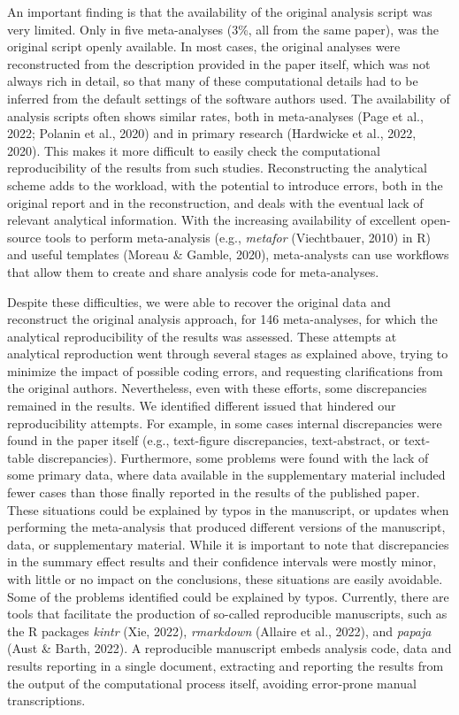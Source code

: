 \documentclass[
  ,apa7,floatsintext]{apa6}
\begin{document}
An important finding is that the availability of the original analysis script was very limited. Only in five meta-analyses (3\%, all from the same paper), was the original script openly available. In most cases, the original analyses were reconstructed from the description provided in the paper itself, which was not always rich in detail, so that many of these computational details had to be inferred from the default settings of the software authors used. The availability of analysis scripts often shows similar rates, both in meta-analyses (Page et al., 2022; Polanin et al., 2020) and in primary research (Hardwicke et al., 2022, 2020). This makes it more difficult to easily check the computational reproducibility of the results from such studies. Reconstructing the analytical scheme adds to the workload, with the potential to introduce errors, both in the original report and in the reconstruction, and deals with the eventual lack of relevant analytical information. With the increasing availability of excellent open-source tools to perform meta-analysis (e.g., \emph{metafor} (Viechtbauer, 2010) in R) and useful templates (Moreau \& Gamble, 2020), meta-analysts can use workflows that allow them to create and share analysis code for meta-analyses.

Despite these difficulties, we were able to recover the original data and reconstruct the original analysis approach, for 146 meta-analyses, for which the analytical reproducibility of the results was assessed. These attempts at analytical reproduction went through several stages as explained above, trying to minimize the impact of possible coding errors, and requesting clarifications from the original authors. Nevertheless, even with these efforts, some discrepancies remained in the results. We identified different issued that hindered our reproducibility attempts. For example, in some cases internal discrepancies were found in the paper itself (e.g., text-figure discrepancies, text-abstract, or text-table discrepancies). Furthermore, some problems were found with the lack of some primary data, where data available in the supplementary material included fewer cases than those finally reported in the results of the published paper. These situations could be explained by typos in the manuscript, or updates when performing the meta-analysis that produced different versions of the manuscript, data, or supplementary material. While it is important to note that discrepancies in the summary effect results and their confidence intervals were mostly minor, with little or no impact on the conclusions, these situations are easily avoidable. Some of the problems identified could be explained by typos. Currently, there are tools that facilitate the production of so-called reproducible manuscripts, such as the R packages \emph{kintr} (Xie, 2022), \emph{rmarkdown} (Allaire et al., 2022), and \emph{papaja} (Aust \& Barth, 2022). A reproducible manuscript embeds analysis code, data and results reporting in a single document, extracting and reporting the results from the output of the computational process itself, avoiding error-prone manual transcriptions.
\end{document}
